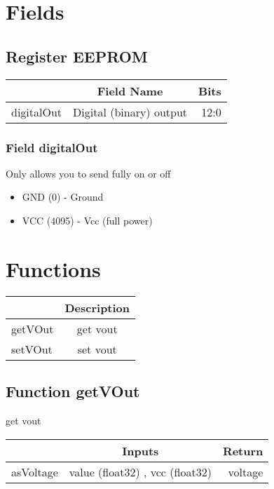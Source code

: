 \documentclass[a4paper,12pt,oneside,pdflatex,italian,final,twocolumn]{article}
\begin{document}
\section{Fields}

 


\raggedright

\subsection{Register EEPROM}
\centering
\begin{tabular}{lcr}
\toprule
  & Field Name & Bits \\
\midrule
digitalOut & Digital (binary) output & 
12:0
\\
\bottomrule

\end{tabular}


\raggedright

\subsubsection{Field digitalOut }

Only allows you to send fully on or off


\begin{itemize}
\item GND (0) - Ground
\item VCC (4095) - Vcc (full power)
\end{itemize}




\raggedright

\section{Functions}

\centering
\begin{tabular}{lc}
\toprule
  & Description \\
\midrule
getVOut & get vout \\
setVOut & set vout \\
\bottomrule
\end{tabular}


\raggedright
\subsection{Function getVOut }
get vout \\

\centering
\begin{tabular}{lcr}
\toprule
  & Inputs & Return \\
\midrule
asVoltage &
value (float32)
, 
vcc (float32)

&
voltage
\\
\bottomrule
\end{tabular}
\end{document}
